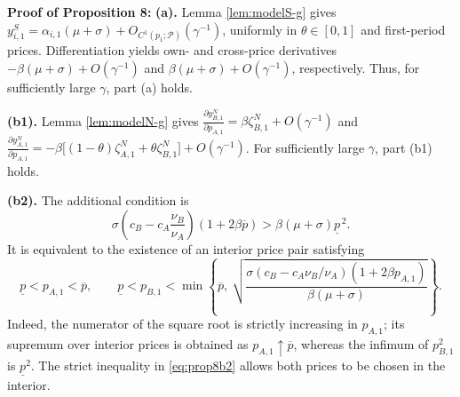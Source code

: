 \documentclass[nonblindrev,copyedit]{informs1}
\begin{document}
\begin{APPENDICES}
{\bf Proof of Proposition 8: }
\textbf{(a).} Lemma \ref{lem:modelS-g} gives $y_{i,1}^S=\alpha_{i,1}(\mu+\sigma)+ O_{C^1(p_1;\mathcal{P})}(\gamma^{-1})$, uniformly in $\theta\in[0,1]$ and first-period prices. Differentiation yields own- and cross-price derivatives $-\beta(\mu+\sigma)+O(\gamma^{-1})$ and $\beta(\mu+\sigma)+O(\gamma^{-1})$, respectively. Thus, for sufficiently large $\gamma$, part (a) holds.

\textbf{(b1).} Lemma \ref{lem:modelN-g} gives $\frac{\partial y_{B,1}^N}{\partial p_{A,1}} =\beta\zeta_{B,1}^{N}+O(\gamma^{-1})$ and  $\frac{\partial y_{A,1}^N}{\partial p_{A,1}} =-\beta\big[(1-\theta)\zeta_{A,1}^{N}+\theta\zeta_{B,1}^{N}\big]+O(\gamma^{-1})$. For sufficiently large $\gamma$, part (b1) holds.

\textbf{(b2).} The additional condition is
\begin{equation}
\sigma\left(c_B-c_A\frac{\nu_B}{\nu_A}\right)(1+2\beta\overline{p}) >\beta(\mu+\sigma)\underline{p}^{\,2}.
\label{eq:prop8b2}
\end{equation}
It is equivalent to the existence of an interior price pair satisfying
\begin{equation}
\underline{p}<p_{A,1}<\overline{p},\qquad \underline{p}<p_{B,1}< \min\left\{\overline{p},\ \sqrt{\frac{\sigma(c_B-c_A\nu_B/\nu_A)(1+2\beta p_{A,1})}{\beta(\mu+\sigma)}}\right\}.
\label{eq:p8region}
\end{equation}
Indeed, the numerator of the square root is strictly increasing in $p_{A,1}$; its supremum over interior prices is obtained as $p_{A,1}\uparrow\overline{p}$, whereas the infimum of $p_{B,1}^2$ is $\underline{p}^2$. The strict inequality in \eqref{eq:prop8b2} allows both prices to be chosen in the interior.


\end{APPENDICES}
\end{document}
